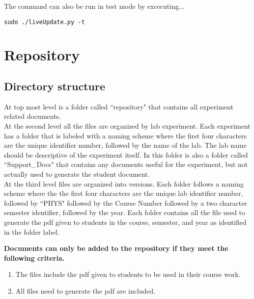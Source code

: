 \documentclass[justified]{book}
\begin{document}
\noindent The command can also be run in test mode by excecuting...

\begin{lstlisting}[backgroundcolor = \color{light-gray}]
sudo ./liveUpdate.py -t
\end{lstlisting}


\section{Repository}

\subsection{Directory structure}

At top most level is a folder called ``repository" that contains all experiment related documents.\\

\noindent At the second level all the files are organized by lab experiment. Each experiment has a folder that is labeled with a naming scheme where the first four characters are the unique identifier number, followed by the name of the lab. The lab name should be descriptive of the experiment itself. In this folder is also a folder called ``Support\_Docs" that contains any documents useful for the experiment, but not actually used to generate the student document. \\

\noindent At the third level files are organized into versions. Each folder follows a naming scheme where the the first four characters are the unique lab identifier number, followed by ``PHYS" followed by the Course Number followed by a two character semester identifier, followed by the year. Each folder contains all the file used to generate the pdf given to students in the course, semester, and year as identified in the folder label. \\


\vspace{12pt}
{\bf Documents can only be added to the repository if they meet the following criteria.}
\begin{enumerate}
\item The files include the pdf given to students to be used in their course work.
\item All files need to generate the pdf are included.
\end{enumerate}
\end{document}
